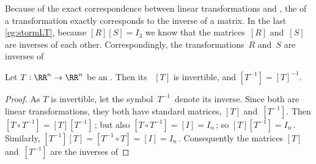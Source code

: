 Because of the exact correspondence between linear transformations and , the  of a transformation exactly corresponds to the inverse of a matrix.
In the last \cref{eg:stormLT}, because \([R][S]=I_3\) we know that the matrices~\([R]\) and~\([S]\) are inverses of each other. 
Correspondingly, the transformations~\(R\) and~\(S\) are inverses of 




\begin{theorem} \label{thm:invsm} 
Let \(T:\RR^n\to\RR^n\) be an  . 
Then its ~\([T]\) is invertible, and \([T^{-1}]=[T]^{-1}\). 
\end{theorem}
\begin{proof} 
As \(T\) is invertible,  let the symbol~\(T^{-1}\)~denote its inverse.
Since both are linear transformations, they both have standard matrices, \([T]\) and~\([T^{-1}]\).
Then \([T\circ T^{-1}]=[T][T^{-1}]\)\,; but also \([T\circ T^{-1}]=[I]=I_n\)\,; so \([T][T^{-1}]=I_n\)\,.
Similarly, \([T^{-1}][T]=[T^{-1}\circ T]=[I]=I_n\)\,.
Consequently the matrices \([T]\) and~\([T^{-1}]\) are the inverses of 
\end{proof}


